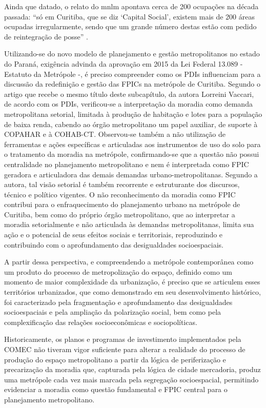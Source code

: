 	Ainda que datado, o relato do \gls{mnlm} apontava cerca de 200 ocupações na década passada: ``só em Curitiba, que se diz `Capital Social', existem mais de 200 áreas ocupadas irregularmente, sendo que um grande número destas estão com pedido de reintegração de posse'' \cite[p. 127]{hilma2009a}.
	
	Utilizando-se do novo modelo de planejamento e gestão metropolitanos no estado do Paraná, exigência advinda da aprovação em 2015 da Lei Federal 13.089 - Estatuto da Metrópole -, é preciso compreender como os PDIs influenciam para a discussão da redefinição e gestão das FPICs na metrópole de Curitiba. Segundo o artigo que recebe o mesmo título deste subcapítulo, da autora Lorreini Vaccari, de acordo com os PDIs, verificou-se a interpretação da moradia como demanda metropolitana setorial, limitada à produção de habitação e lotes para a população de baixa renda, cabendo ao órgão metropolitano um papel auxiliar, de suporte à COPAHAR e à COHAB-CT. Observou-se também a não utilização de ferramentas e ações específicas e articuladas aos instrumentos de uso do solo para o tratamento da moradia na metrópole, confirmando-se que a questão não possui centralidade no planejamento metropolitano e nem é interpretada como FPIC geradora e articuladora das demais demandas urbano-metropolitanas. Segundo a autora, tal visão setorial é também recorrente e estruturante dos discursos, técnico e político vigentes. O não reconhecimento da moradia como FPIC contribui para o enfraquecimento do planejamento urbano na metrópole de Curitiba, bem como do próprio órgão metropolitano, que ao interpretar a moradia setorialmente e não articulada às demandas metropolitanas, limita sua ação e o potencial de seus efeitos sociais e territoriais, reproduzindo e contribuindo com o aprofundamento das desigualdades socioespaciais.
	
	A partir dessa perspectiva, e compreendendo a metrópole contemporânea como um produto do processo de metropolização do espaço, definido como um momento de maior complexidade da urbanização, é preciso que se articulem esses territórios urbanizados, que como demonstrado em seu desenvolvimento histórico, foi caracterizado pela fragmentação e aprofundamento das desigualdades socioespaciais e pela ampliação da polarização social, bem como pela complexificação das relações socioeconômicas e sociopolíticas.
	
	Historicamente, os planos e programas de investimento implementados pela COMEC não tiveram vigor suficiente para alterar a realidade do processo de produção do espaço metropolitano a partir da lógica de periferização e precarização da moradia que, capturada pela lógica de cidade mercadoria, produz uma metrópole cada vez mais marcada pela segregação socioespacial, permitindo evidenciar a moradia como questão fundamental e FPIC central para o planejamento metropolitano. 
	
